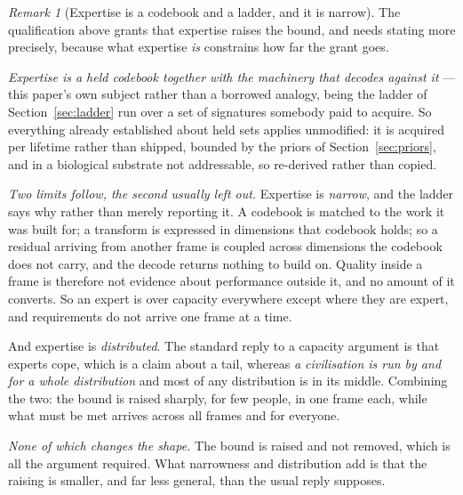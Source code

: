 \documentclass[11pt,a4paper]{article}
\theoremstyle{remark}
\newtheorem{remark}[definition]{Remark}
\begin{document}
\begin{remark}[Expertise is a codebook and a ladder, and it is narrow]\label{rem:expertise}
The qualification above grants that expertise raises the bound, and needs stating more precisely,
because what expertise \emph{is} constrains how far the grant goes.

\emph{Expertise is a held codebook together with the machinery that decodes against it} --- this paper's
own subject rather than a borrowed analogy, being the ladder of Section~\ref{sec:ladder} run over a set
of signatures somebody paid to acquire. So everything already established about held sets applies
unmodified: it is acquired per lifetime rather than shipped, bounded by the priors of
Section~\ref{sec:priors}, and in a biological substrate not addressable, so re-derived rather than
copied.

\emph{Two limits follow, the second usually left out.} Expertise is \emph{narrow}, and the ladder says
why rather than merely reporting it. A codebook is matched to the work it was built for; a transform is
expressed in dimensions that codebook holds; so a residual arriving from another frame is coupled
across dimensions the codebook does not carry, and the decode returns nothing to build on. Quality
inside a frame is therefore not evidence about performance outside it, and no amount of it converts.
So an expert is over capacity everywhere except where they are expert, and requirements do not arrive
one frame at a time.

And expertise is \emph{distributed}. The standard reply to a capacity argument is that experts cope,
which is a claim about a tail, whereas \emph{a civilisation is run by and for a whole distribution} and
most of any distribution is in its middle. Combining the two: the bound is raised sharply, for few
people, in one frame each, while what must be met arrives across all frames and for everyone.

\emph{None of which changes the shape.} The bound is raised and not removed, which is all the argument
required. What narrowness and distribution add is that the raising is smaller, and far less general,
than the usual reply supposes.
\end{remark}
\end{document}
